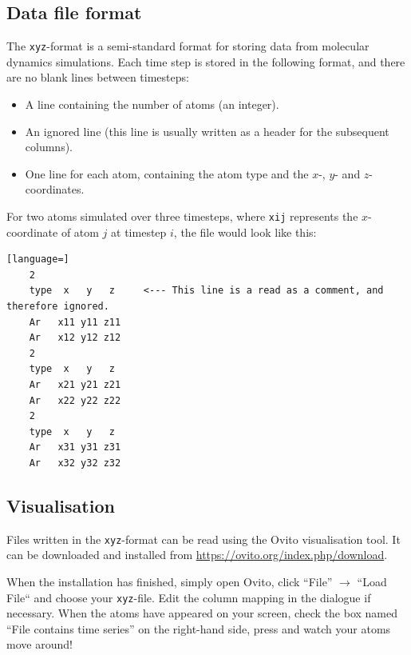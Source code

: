 \documentclass[11pt,british,a4paper]{report}
\begin{document}
\subsection{Data file format}\label{app:xyz}
The \texttt{xyz}-format is a semi-standard format for storing data from molecular dynamics simulations. Each time step is stored in the following format, and there are no blank lines between timesteps:
\begin{itemize}
    \item A line containing the number of atoms (an integer).
    \item An ignored line (this line is usually written as a header for the subsequent columns).
    \item One line for each atom, containing the atom type and the \(x\)-, \(y\)- and \(z\)-coordinates.
\end{itemize}
For two atoms simulated over three timesteps, where \texttt{xij} represents the \(x\)-coordinate of atom \(j\) at timestep \(i\), the file would look like this:
\begin{lstlisting}[language=]
    2
    type  x   y   z     <--- This line is a read as a comment, and therefore ignored.
    Ar   x11 y11 z11
    Ar   x12 y12 z12
    2
    type  x   y   z
    Ar   x21 y21 z21
    Ar   x22 y22 z22
    2
    type  x   y   z
    Ar   x31 y31 z31
    Ar   x32 y32 z32
\end{lstlisting}


\tikzexternaldisable
\subsection{Visualisation}\label{app:ovito}
Files written in the \texttt{xyz}-format can be read using the Ovito visualisation tool. It can be downloaded and installed from \url{https://ovito.org/index.php/download}.

When the installation has finished, simply open Ovito, click ``File'' \(\to\) ``Load File`` and choose your \texttt{xyz}-file. Edit the column mapping in the dialogue if necessary. When the atoms have appeared on your screen, check the box named ``File contains time series'' on the right-hand side, press  and watch your atoms move around!

\end{document}
